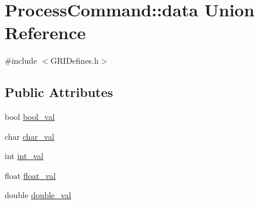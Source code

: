 \hypertarget{unionProcessCommand_1_1data}{\section{\-Process\-Command\-:\-:data \-Union \-Reference}
\label{unionProcessCommand_1_1data}
}


{\ttfamily \#include $<$\-G\-R\-I\-Defines.\-h$>$}

\subsection*{\-Public \-Attributes}
\begin{DoxyCompactItemize}
\item 
bool \hyperlink{unionProcessCommand_1_1data_a7c0c7bccecc8e9b97293f27883ffab98}{bool\-\_\-val}
\item 
char \hyperlink{unionProcessCommand_1_1data_ab3a6b574647d15f9e01f62ffcfd3f578}{char\-\_\-val}
\item 
int \hyperlink{unionProcessCommand_1_1data_a601882d42e776e5072dacf0fd41bbce5}{int\-\_\-val}
\item 
float \hyperlink{unionProcessCommand_1_1data_aa06b1090af8e5e0c6ae8e41d3e546974}{float\-\_\-val}
\item 
double \hyperlink{unionProcessCommand_1_1data_a69fc7fb2e0672163d4d323d2dab1deb9}{double\-\_\-val}
\end{DoxyCompactItemize}


